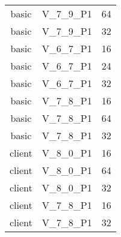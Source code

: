 \begin{longtable}{|c|c|c|}
            basic & V\_7\_9\_P1 & 64 \\
            basic & V\_7\_9\_P1 & 32 \\
            basic & V\_6\_7\_P1 & 16 \\
            basic & V\_6\_7\_P1 & 24 \\
            basic & V\_6\_7\_P1 & 32 \\
            basic & V\_7\_8\_P1 & 16 \\
            basic & V\_7\_8\_P1 & 64 \\
            basic & V\_7\_8\_P1 & 32 \\
            client & V\_8\_0\_P1 & 16 \\
            client & V\_8\_0\_P1 & 64 \\
            client & V\_8\_0\_P1 & 32 \\
            client & V\_7\_8\_P1 & 16 \\
            client & V\_7\_8\_P1 & 32 \\
        \end{longtable}


